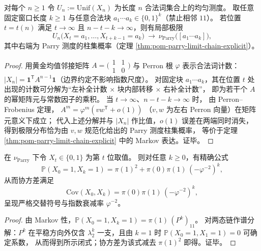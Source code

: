 \begin{proposition}\label{prop:pom-unif-xn-local-limit-parry}
对每个 \(n\ge 1\) 令 \(U_n:=\mathrm{Unif}(X_n)\) 为长度 \(n\) 合法词集合上的均匀测度。
取任意固定窗口长度 \(k\ge 1\) 与任意合法块 \(a_1\cdots a_k\in\{0,1\}^k\)（禁止相邻 \(11\)）。
若位置 \(t=t(n)\) 满足 \(t\to\infty\) 且 \(n-t-k\to\infty\)，则有局部极限
\[
U_n\bigl(X_t=a_1,\dots,X_{t+k-1}=a_k\bigr)\ \longrightarrow\ 
\nu_{\mathrm{Parry}}\bigl([a_1\cdots a_k]\bigr),
\]
其中右端为 Parry 测度的柱集概率（定理 \ref{thm:pom-parry-limit-chain-explicit}）。
\end{proposition}
\begin{proof}
用黄金均值邻接矩阵 \(A=\bigl(\begin{smallmatrix}1&1\\1&0\end{smallmatrix}\bigr)\) 与 Perron 根 \(\varphi\) 表示合法词计数：
\(|X_n|=\mathbf 1^{\mathsf T}A^{n-1}\mathbf 1\)（边界约定不影响指数尺度）。
对固定块 \(a_1\cdots a_k\)，其在位置 \(t\) 处出现的计数可分解为“左补全计数 \(\times\) 块内部转移 \(\times\) 右补全计数”，
即为若干个 \(A\) 的幂矩阵元与常数因子的乘积。
当 \(t\to\infty\)、\(n-t-k\to\infty\) 时，
由 Perron--Frobenius 定理，
\(
A^m=\varphi^m(vw^{\mathsf T}+o(1))
\)
（\(v,w\) 为左右 Perron 向量）在矩阵元意义下成立；
代入上述分解并与 \(|X_n|\) 作比值，\(o(1)\) 误差在两端同时消失，
得到极限分布恰为由 \(v,w\) 规范化给出的 Parry 测度柱集概率，
等价于定理 \ref{thm:pom-parry-limit-chain-explicit} 中的 Markov 表达。证毕。
\end{proof}

\begin{corollary}[二点函数与交替相关长度]\label{cor:pom-parry-two-point-alternating}
在 \(\nu_{\mathrm{Parry}}\) 下令 \(X_t\in\{0,1\}\) 为第 \(t\) 位取值。
则对任意 \(k\ge 0\)，有精确公式
\[
\mathbb P(X_0=1,X_k=1)
=\pi(1)^2+\pi(0)\pi(1)\,(-\varphi^{-2})^{k},
\]
从而协方差满足
\[
\mathrm{Cov}(X_0,X_k)=\pi(0)\pi(1)\,(-\varphi^{-2})^{k},
\]
呈现严格交替符号与指数衰减率 \(\varphi^{-2}\)。
\end{corollary}
\begin{proof}
由 Markov 性，\(\mathbb P(X_0=1,X_k=1)=\pi(1)\,(P^k)_{11}\)。
对两态链作谱分解：\(P^k\) 在平稳方向外仅含 \(\lambda_2^k\) 一支，且由 \(k=1\) 时 \(\mathbb P(X_0=1,X_1=1)=0\) 可确定系数，
从而得到所示闭式；协方差为该式减去 \(\pi(1)^2\) 即得。证毕。
\end{proof}

